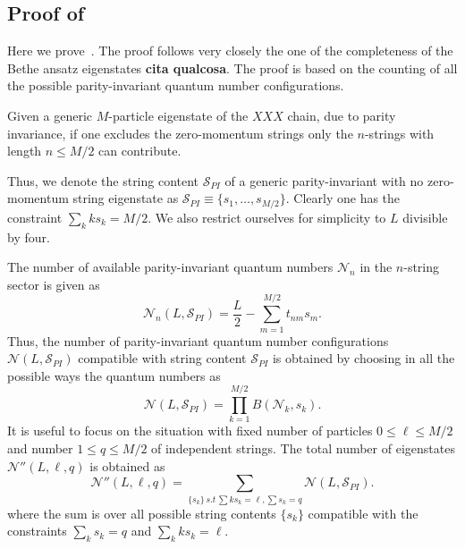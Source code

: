 \documentclass[11pt]{iopart}
\begin{document}
\subsection{Proof of~}

Here we prove~. The proof follows very closely the one of the 
completeness of the Bethe ansatz eigenstates {\bf cita qualcosa}. The proof is 
based on the counting of all the possible parity-invariant quantum number configurations. 

Given a generic $M$-particle eigenstate of the $XXX$ chain, due to parity invariance, 
if one excludes the zero-momentum strings only the $n$-strings with length $n\le M/2$ 
can contribute.

Thus, we denote the string content ${\mathcal S_{PI}}$ of a generic parity-invariant 
with no zero-momentum string eigenstate as ${\mathcal S}_{PI}\equiv\{s_1,\dots,s_{M/2}\}$.
Clearly one has the constraint $\sum_k ks_k=M/2$. We also restrict ourselves for simplicity 
to $L$ divisible by four. 

The number of available parity-invariant quantum numbers ${\mathcal N}_n$ in the $n$-string 
sector is given as  
%
\begin{equation}
{\mathcal N}_n(L,{\mathcal S}_{PI})=\frac{L}{2}-\sum_{m=1}^{M/2}t_{nm}s_m.
\end{equation}
%
Thus, the number of parity-invariant quantum number configurations ${\mathcal N}(L,{\mathcal 
S}_{PI})$ compatible with string content ${\mathcal S}_{PI}$ is obtained by choosing in 
all the possible ways the quantum numbers as  
%
\begin{equation}
{\mathcal N}(L,{\mathcal S}_{PI})=\prod_{k=1}^{M/2} B({\mathcal N}_k,s_k).
\end{equation}
%
It is useful to focus on the situation with fixed number of particles $0\le\ell\le M/2$ 
and number $1\le q\le M/2$ of independent strings. The total number of eigenstates 
${\mathcal N}''(L,\ell,q)$ is obtained as  
%
\begin{equation}
\label{eq}
{\mathcal N}''(L,\ell,q)=\sum\limits_{\{s_k\}\,s.t\, \sum k s_k=\ell, \sum s_k=q}{\mathcal N}(L,
{\mathcal S}_{PI}).
\end{equation}
%
where the sum is over all possible string contents $\{s_k\}$ compatible with the constraints 
$\sum_k s_k=q$ and $\sum_k k s_k=\ell$. 
\end{document}
